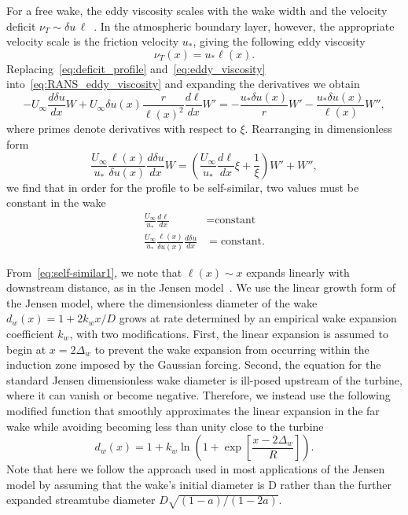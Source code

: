 For a free wake, the eddy viscosity scales with the wake width and the velocity deficit $\nu_T \sim \delta u \, \ell$~\cite{Tennekes1972a}. In the atmospheric boundary layer, however, the appropriate velocity scale is the friction velocity $u_*$, giving the following eddy viscosity
\begin{equation}
\label{eq:eddy_viscosity}
\nu_T(x) = u_* \ell(x).
\end{equation}
Replacing~\eqref{eq:deficit_profile} and~\eqref{eq:eddy_viscosity} into~\eqref{eq:RANS_eddy_viscosity} and expanding the derivatives we obtain
\begin{equation}
-U_\infty \frac{d \delta u}{dx} W + U_\infty \delta u(x)\frac{r }{\ell(x)^2} \frac{d \ell}{dx}W' = -\frac{u_* \delta u(x)}{r} W' -\frac{u_* \delta u(x)}{\ell(x)} W'',
\end{equation}
where primes denote derivatives with respect to $\xi$. Rearranging in dimensionless form
\begin{equation}
\frac{U_\infty}{u_*}  \frac{\ell(x)}{\delta u(x)}  \frac{d \delta u}{dx} W = \left(\frac{U_\infty}{u_*} \frac{d \ell}{dx} \xi  + \frac{1}{\xi}\right)W' +W'',
\end{equation}
we find that in order for the profile to be self-similar, two values must be constant in the wake
\begin{align}
\label{eq:self-similar1}
\frac{U_\infty}{u_*} \frac{d \ell}{dx} &= \text{constant} \\
\label{eq:self-similar2}
\frac{U_\infty}{u_*}  \frac{\ell(x)}{\delta u(x)}  \frac{d \delta u}{dx} &= \text{constant}.
\end{align}

From~\eqref{eq:self-similar1}, we note that $\ell(x) \sim x$ expands linearly with downstream distance, as in the Jensen model~\cite{Jensen1983a, Katic1986a}. We use the linear growth form of the Jensen model, where the dimensionless diameter of the wake $d_w(x) = 1 + 2k_wx/D$ grows at rate determined by an empirical wake expansion coefficient  $k_w$, with two modifications. First, the linear expansion is assumed to begin at $x = 2\Delta_w$ to prevent the wake expansion from occurring within the induction zone imposed by the Gaussian forcing. Second, the equation for the standard Jensen dimensionless wake diameter is ill-posed upstream of the turbine, where it can vanish or become negative. Therefore, we instead use the following modified function that smoothly approximates the linear expansion in the far wake while avoiding becoming less than unity close to the turbine
\begin{equation}
d_w(x) = 1 + k_w\ln \left(1 + \exp \left[\frac{x-2\Delta_w}{R}\right]\right).
\end{equation}
Note that here we follow the approach used in most applications of the Jensen model by assuming that the wake's initial diameter is D rather than the further expanded streamtube diameter $D \sqrt{(1-a)/(1-2a)}$.

